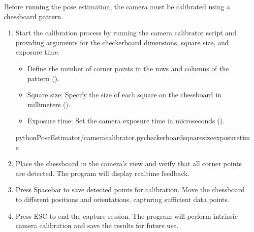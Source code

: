 \documentclass[letterpaper,10pt,english]{sphinxmanual}
\let\sphinxpxdimen\pdfpxdimen\else\newdimen\sphinxpxdimen
\begin{document}
\sphinxAtStartPar
Before running the pose estimation, the camera must be calibrated using a chessboard pattern.
\begin{enumerate}
%
\item {} 
\sphinxAtStartPar
Start the calibration process by running the camera calibrator script and providing arguments for the checkerboard dimensions, square size, and exposure time.
\begin{itemize}
\item {} 
\sphinxAtStartPar
Define the number of corner points in the rows and columns of the pattern ().

\item {} 
\sphinxAtStartPar
Square size: Specify the size of each square on the chessboard in millimeters ().

\item {} 
\sphinxAtStartPar
Exposure time: Set the camera exposure time in microseconds ().

\end{itemize}

\begin{sphinxVerbatim}[commandchars=\\\{\}]
pythonPoseEstimator/camera\PYGZus{}calibrator.py\PYGZhy{}\PYGZhy{}checkerboard\PYGZhy{}\PYGZhy{}square\PYGZus{}size\PYGZhy{}\PYGZhy{}exposure\PYGZus{}time
\end{sphinxVerbatim}

\item {} 
\sphinxAtStartPar
Place the chessboard in the camera’s view and verify that all corner points are detected. The program will display real\sphinxhyphen{}time feedback.

\noindent{\hspace*{\fill}\sphinxincludegraphics[width=1200\sphinxpxdimen]{{image_0}.png}\hspace*{\fill}}

\item {} 
\sphinxAtStartPar
Press Spacebar to save detected points for calibration. Move the chessboard to different positions and orientations, capturing sufficient data points.

\item {} 
\sphinxAtStartPar
Press ESC to end the capture session. The program will perform intrinsic camera calibration and save the results for future use.

\end{enumerate}
\end{document}
